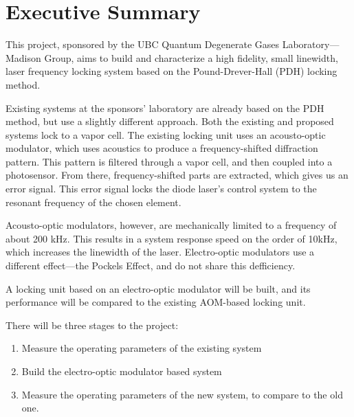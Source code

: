 \newpage
\section*{Executive Summary}

This project, sponsored by the UBC Quantum Degenerate Gases
Laboratory---Madison Group, aims to build and characterize a high
fidelity, small linewidth, laser frequency locking system based on the
Pound-Drever-Hall (PDH) locking method.

Existing systems at the sponsors' laboratory are already based 
on the PDH method, but use a slightly different approach.  Both the 
existing and proposed systems lock to a vapor cell.  The
existing locking unit uses an acousto-optic modulator, which uses acoustics
to produce a frequency-shifted diffraction pattern.  This pattern is filtered
through a vapor cell, and then coupled into a photosensor.  From there,
frequency-shifted parts are extracted, which gives us an error signal.  This
error signal locks the diode laser's control system to the resonant frequency
of the chosen element.

Acousto-optic modulators, however, are mechanically limited to a frequency
of about 200 kHz.  This results in a system response speed on the order of
10kHz, which increases the linewidth of the laser.  Electro-optic modulators
use a different effect---the Pockels Effect, and
do not share this defficiency.

A locking unit based on an electro-optic modulator will be built, and its
performance will be compared to the existing AOM-based locking unit.

There will be three stages to the project:

\begin{enumerate}
 \item Measure the operating parameters of the existing system
 \item Build the electro-optic modulator based system
 \item Measure the operating parameters of the new system, to compare to the old one.
\end{enumerate}

